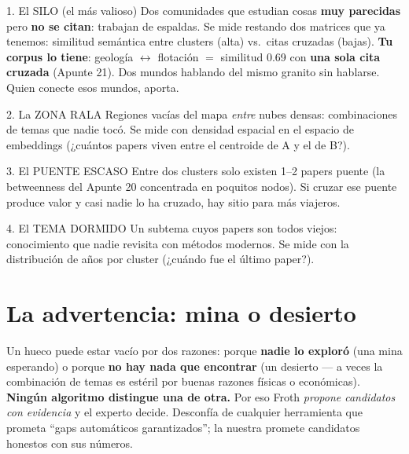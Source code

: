 \documentclass[11pt,a4paper]{article}
\begin{document}
\begin{concepto}{1. El SILO (el más valioso)}
Dos comunidades que estudian cosas \textbf{muy parecidas} pero \textbf{no se citan}: trabajan
de espaldas. Se mide restando dos matrices que ya tenemos: similitud semántica entre clusters
(alta) vs.\ citas cruzadas (bajas). \textbf{Tu corpus lo tiene}: geología $\leftrightarrow$
flotación $=$ similitud 0.69 con \textbf{una sola cita cruzada} (Apunte 21). Dos mundos
hablando del mismo granito sin hablarse. Quien conecte esos mundos, aporta.
\end{concepto}

\begin{concepto}{2. La ZONA RALA}
Regiones vacías del mapa \emph{entre} nubes densas: combinaciones de temas que nadie tocó.
Se mide con densidad espacial en el espacio de embeddings (¿cuántos papers viven entre el
centroide de A y el de B?).
\end{concepto}

\begin{concepto}{3. El PUENTE ESCASO}
Entre dos clusters solo existen 1--2 papers puente (la betweenness del Apunte 20 concentrada
en poquitos nodos). Si cruzar ese puente produce valor y casi nadie lo ha cruzado, hay sitio
para más viajeros.
\end{concepto}

\begin{concepto}{4. El TEMA DORMIDO}
Un subtema cuyos papers son todos viejos: conocimiento que nadie revisita con métodos
modernos. Se mide con la distribución de años por cluster (¿cuándo fue el último paper?).
\end{concepto}

\section{La advertencia: mina o desierto}

\begin{ojo}
Un hueco puede estar vacío por dos razones: porque \textbf{nadie lo exploró} (una mina
esperando) o porque \textbf{no hay nada que encontrar} (un desierto — a veces la combinación
de temas es estéril por buenas razones físicas o económicas). \textbf{Ningún algoritmo
distingue una de otra.} Por eso Froth \emph{propone candidatos con evidencia} y el experto
decide. Desconfía de cualquier herramienta que prometa ``gaps automáticos garantizados'';
la nuestra promete candidatos honestos con sus números.
\end{ojo}
\end{document}
